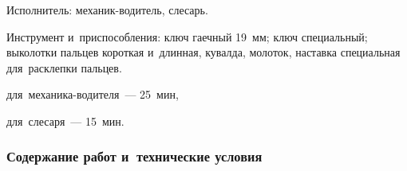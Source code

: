 \noindent
Исполнитель: механик-водитель, слесарь. 

\noindent
Инструмент и~приспособления: ключ гаечный 19~мм; ключ специальный; выколотки пальцев короткая и~длинная, кувалда, молоток, наставка специальная для~расклепки пальцев. 

\begin{standarttime}
    \item для~механика-водителя~--- 25~мин,
    \item для~слесаря~--- 15~мин.
\end{standarttime}



\subsubsection{Содержание работ и~технические условия}

